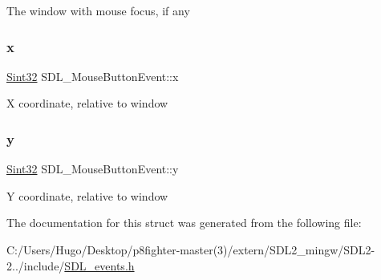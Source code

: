 The window with mouse focus, if any \mbox{\label{struct_s_d_l___mouse_button_event_a5bb9c61b86e999f58637511e32e3a076}} 
\subsubsection{\texorpdfstring{x}{x}}
{\footnotesize\ttfamily \hyperlink{_s_d_l__stdinc_8h_a7a90b941db9d4582e9ad7abb9940ff7e}{Sint32} S\+D\+L\+\_\+\+Mouse\+Button\+Event\+::x}

X coordinate, relative to window \mbox{\label{struct_s_d_l___mouse_button_event_a7ccb5c55a7ddadce723f4ea6d5269540}} 
\subsubsection{\texorpdfstring{y}{y}}
{\footnotesize\ttfamily \hyperlink{_s_d_l__stdinc_8h_a7a90b941db9d4582e9ad7abb9940ff7e}{Sint32} S\+D\+L\+\_\+\+Mouse\+Button\+Event\+::y}

Y coordinate, relative to window 

The documentation for this struct was generated from the following file\+:\begin{DoxyCompactItemize}
\item 
C\+:/\+Users/\+Hugo/\+Desktop/p8fighter-\/master(3)/extern/\+S\+D\+L2\+\_\+mingw/\+S\+D\+L2-\/2../include/\hyperlink{_s_d_l__events_8h}{S\+D\+L\+\_\+events.\+h}\end{DoxyCompactItemize}
